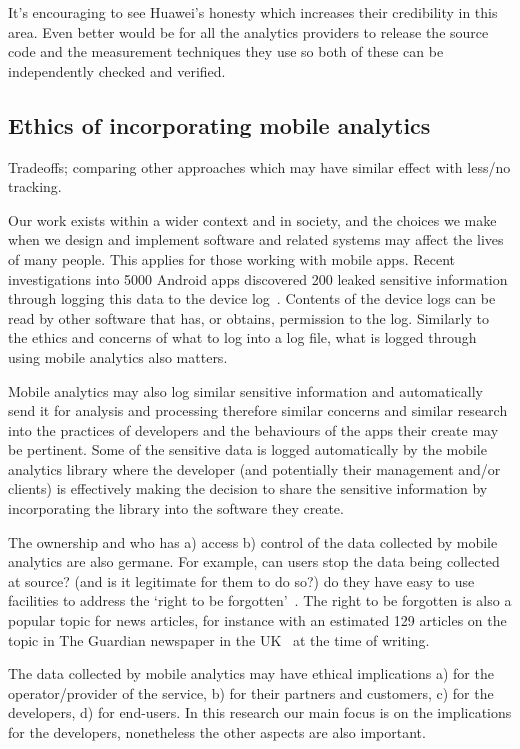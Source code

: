 It's encouraging to see Huawei's honesty which increases their credibility in this area. Even better would be for all the analytics providers to release the source code and the measurement techniques they use so both of these can be independently checked and verified.


\subsection{Ethics of incorporating mobile analytics}
Tradeoffs; comparing other approaches which may have similar effect with less/no tracking.

Our work exists within a wider context and in society, and the choices we make when we design and implement software and related systems may affect the lives of many people. This applies for those working with mobile apps. Recent investigations into 5000 Android apps discovered 200 leaked sensitive information through logging this data to the device log~. Contents of the device logs can be read by other software that has, or obtains, permission to the log. 
%
Similarly to the ethics and concerns of what to log into a log file, what is logged through using mobile analytics also matters.

Mobile analytics may also log similar sensitive information and automatically send it for analysis and processing therefore similar concerns and similar research into the practices of developers and the behaviours of the apps their create may be pertinent. Some of the sensitive data is logged automatically by the mobile analytics library where the developer (and potentially their management and/or clients) is effectively making the decision to share the sensitive information by incorporating the library into the software they create.

The ownership and who has a) access b) control of the data collected by mobile analytics are also germane. For example, can users stop the data being collected at source? (and is it legitimate for them to do so?) do they have easy to use facilities to address the `right to be forgotten'~. The right to be forgotten is also a popular topic for news articles, for instance with an estimated 129 articles on the topic in The Guardian newspaper in the UK~ at the time of writing. 

The data collected by mobile analytics may have ethical implications a) for the operator/provider of the service, b) for their partners and customers, c) for the developers, d) for end-users. In this research our main focus is on the implications for the developers, nonetheless the other aspects are also important.

